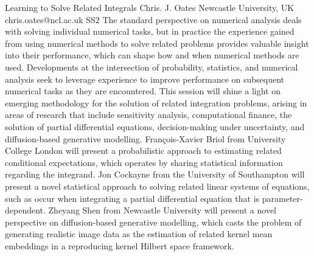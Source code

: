 \documentclass[12pt,a4paper,figuresright]{book}
\begin{document}
\begin{session}
 {Learning to Solve Related Integrals}%
 {Chris. J. Oates}%
 {Newcastle University, UK}%
 {chris.oates@ncl.ac.uk}%
 {}%
 {}%
 {}%
 {SS2}
 {}%
 The standard perspective on numerical analysis deals with solving individual numerical tasks, but in practice the experience gained from using numerical methods to solve related problems provides valuable insight into their performance, which can shape how and when numerical methods are used.
 Developments at the intersection of probability, statistics, and numerical analysis seek to leverage experience to improve performance on subsequent numerical tasks as they are encountered.
 This session will shine a light on emerging methodology for the solution of related integration problems, arising in areas of research that include sensitivity analysis, computational finance, the solution of partial differential equations, decision-making under uncertainty, and diffusion-based generative modelling.
 Fran\c{c}ois-Xavier Briol from University College London will present a probabilistic approach to estimating related conditional expectations, which operates by sharing statistical information regarding the integrand.
 Jon Cockayne from the University of Southampton will present a novel statistical approach to solving related linear systems of equations, such as occur when integrating a partial differential equation that is parameter-dependent.
 Zheyang Shen from Newcastle University will present a novel perspective on diffusion-based generative modelling, which casts the problem of generating realistic image data as the estimation of related kernel mean embeddings in a reproducing kernel Hilbert space framework.
\end{session}





\clearpage
\end{document}
